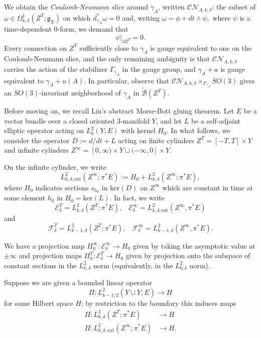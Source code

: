 \documentclass{memo-l}
\newcommand{\pE}{\pi^* \! E}
\theoremstyle{definition}
\theoremstyle{remark}
\numberwithin{section}{chapter}
\numberwithin{equation}{chapter}
\begin{document}
We obtain the \emph{Coulomb-Neumann slice} around $\gamma_A$, written $\mathcal{CN}_{A,k,\delta}$: the subset of $\omega \in \Omega^1_{k,\delta}(Z^T;\mathfrak g_E)$ on which $d_{\gamma_A}^* \omega = 0$ and, writing $\omega = \phi + dt \wedge \psi,$ where $\psi$ is a time-dependent $0$-form, we demand that 
$$\psi\big|_{\partial Z^T} = 0.$$
Every connection on $Z^T$ sufficiently close to $\gamma_A$ is gauge equivalent to one on the Coulomb-Neumann slice, and the only remaining ambiguity is that $\mathcal{CN}_{A,k,\delta}$ carries the action of the stabilizer $\Gamma_{\gamma_A}$ in the gauge group, and $\gamma_A + a$ is gauge equivalent to $\gamma_A + u(A)$. In particular, observe that $\mathcal{CN}_{A,k,\delta} \times_{\Gamma_{\gamma_A}} SO(3)$ gives an $SO(3)$-invariant neighborhood of $\gamma_A$ in $\widetilde{\mathcal B}(Z^T)$.

Before moving on, we recall Lin's abstract Morse-Bott gluing theorem. Let $E$ be a vector bundle over a closed oriented 3-manifold $Y$, and let $L$ be a self-adjoint elliptic operator acting on $L^2_k(Y;E)$ with kernel $H_0$. In what follows, we consider the operator $D := d/dt + L$ acting on finite cylinders $Z^T = [-T,T] \times Y$ and infinite cylinders $Z^\infty = [0,\infty) \times Y \sqcup (-\infty, 0] \times Y$.

On the infinite cylinder, we write 
$$L^2_{k,\delta,\text{ext}}(Z^\infty;\pE) := H_0 + L^2_{k,\delta}(Z^\infty;\pE),$$ 
where $H_0$ indicates sections $s_{h_0}$ in $\text{ker}(D)$ on $Z^\infty$ which are constant in time at some element $h_0$ in $H_0 = \text{ker}(L)$. In fact, we write 
$$\mathcal E^T_\delta = L^2_{k,\delta}(Z^T;\pE), \;\;\; \mathcal E^\infty_\delta = L^2_{k,\delta,\text{ext}}(Z^\infty, \pE)$$ 
and 
$$\mathcal F^T_\delta = L^2_{k-1,\delta}(Z^T;\pE), \;\;\; \mathcal F^\infty_\delta = L^2_{k-1,\delta}(Z^\infty, \pE).$$ 

We have a projection map $\Pi^\infty_0: \mathcal E^\infty_\delta \to H_0$ given by taking the asymptotic value at $\pm \infty$ and projection maps $\Pi^T_0: \mathcal E^T_\delta \to H_0$ given by projection onto the subspace of constant sections in the $L^2_{k,\delta}$ norm (equivalently, in the $L^2_{0,\delta}$ norm).

Suppose we are given a bounded linear operator 
$$\Pi: L^2_{k-1/2}(Y \sqcup \overline Y; E) \to H$$ 
for some Hilbert space $H$; by restriction to the boundary this induces maps 
\begin{align*}\Pi: L^2_{k,\delta}(Z^T;\pE) &\to H\\
\Pi: L^2_{k,\delta,\text{ext}}(Z^\infty;\pE) &\to H.
\end{align*}
\end{document}
